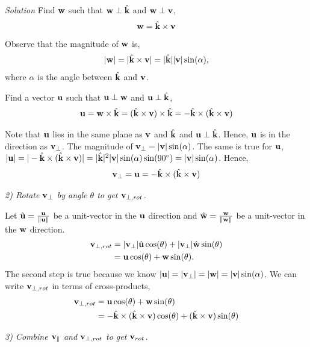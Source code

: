 \documentclass{article}
\numberwithin{prob}{section}
\newenvironment{solution}{\emph{Solution}}{}
\begin{document}
\begin{solution}
Find $\mathbf{w}$ such that $\mathbf{w} \perp \hat{\mathbf{k}}$ and $\mathbf{w} \perp \mathbf{v}$,
\begin{align}
  \mathbf{w} = \hat{\mathbf{k}} \times \mathbf{v}
\end{align}
Observe that the magnitude of $\mathbf{w}$ is,
\begin{align}
  |\mathbf{w}| = |\hat{\mathbf{k}} \times \mathbf{v}| = |\hat{\mathbf{k}}||\mathbf{v}|\sin(\alpha),
\end{align}
where $\alpha$ is the angle between $\hat{\mathbf{k}}$ and $\mathbf{v}$.

Find a vector $\mathbf{u}$ such that $\mathbf{u} \perp \mathbf{w}$ and $\mathbf{u} \perp  \hat{\mathbf{k}}$,
\begin{align}
  \mathbf{u} = \mathbf{w} \times \hat{\mathbf{k}} = (\hat{\mathbf{k}} \times \mathbf{v}) \times \hat{\mathbf{k}} = - \hat{\mathbf{k}} \times (\hat{\mathbf{k}} \times \mathbf{v})
\end{align}

Note that $\mathbf{u}$ lies in the same plane as $\mathbf{v}$ and $\hat{\mathbf{k}}$ and $\mathbf{u} \perp \hat{\mathbf{k}}$. Hence, $\mathbf{u}$ is in the direction as $\mathbf{v}_\perp$. 
The magnitude of $\mathbf{v}_\perp = |\mathbf{v}|\sin(\alpha)$. The same is true for $\mathbf{u}$, $|\mathbf{u}| = |- \hat{\mathbf{k}} \times (\hat{\mathbf{k}} \times \mathbf{v})| = |\hat{\mathbf{k}}|^2|\mathbf{v}|\sin(\alpha)\sin(90^\circ) = |\mathbf{v}|\sin(\alpha)$. Hence, 
\begin{align}
  \mathbf{v}_\perp = \mathbf{u} = - \hat{\mathbf{k}} \times (\hat{\mathbf{k}} \times \mathbf{v})
\end{align}

\emph{2) Rotate $\mathbf{v}_\perp$ by angle $\theta$ to get $\mathbf{v}_{\perp,rot}$.}

Let $\hat{\mathbf{u}} = \frac{\mathbf{u}}{\|\mathbf{u}\|}$ be a unit-vector in the $\mathbf{u}$ direction and $\hat{\mathbf{w}} = \frac{\mathbf{w}}{\|\mathbf{w}\|}$ be a unit-vector in the $\mathbf{w}$ direction.
\begin{align}
  \mathbf{v}_{\perp,rot} &= |\mathbf{v}_\perp|\hat{\mathbf{u}} \cos(\theta) + |\mathbf{v}_\perp|\hat{\mathbf{w}} \sin(\theta)\\
                   &=\mathbf{u} \cos(\theta) + \mathbf{w} \sin(\theta).
\end{align}
The second step is true  because we know $|\mathbf{u}| = |\mathbf{v}_\perp| = |\mathbf{w}| = |\mathbf{v}| \sin(\alpha)$.
We can write $\mathbf{v}_{\perp,rot}$ in terms of cross-products,
\begin{align}
  \mathbf{v}_{\perp,rot} &=\mathbf{u} \cos(\theta) + \mathbf{w} \sin(\theta)\\
                   &= - \hat{\mathbf{k}} \times (\hat{\mathbf{k}} \times \mathbf{v}) \cos(\theta) + (\hat{\mathbf{k}} \times \mathbf{v})\sin(\theta)
\end{align}

\emph{3) Combine $\mathbf{v}_\parallel$ and $\mathbf{v}_{\perp,rot}$ to get $\mathbf{v}_{rot}$. }


\end{solution}
\end{document}
